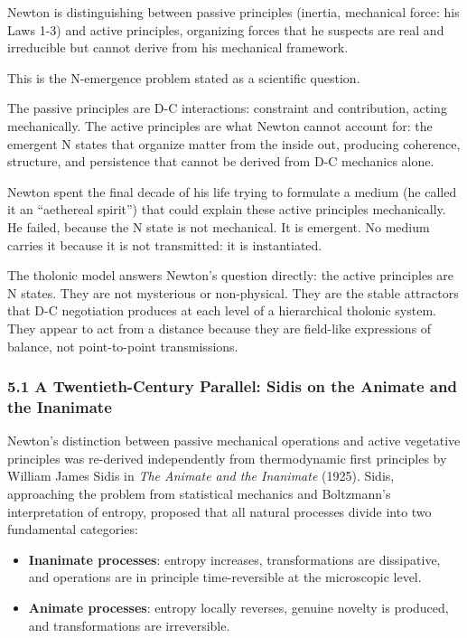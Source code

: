 \documentclass[
  11pt,
  letterpaper,
]{article}
\providecommand{\tightlist}{%
  \setlength{\itemsep}{0pt}\setlength{\parskip}{0pt}}
\begin{document}
Newton is distinguishing between passive principles (inertia, mechanical
force: his Laws 1-3) and active principles, organizing forces that he
suspects are real and irreducible but cannot derive from his mechanical
framework.

This is the N-emergence problem stated as a scientific question.

The passive principles are D-C interactions: constraint and
contribution, acting mechanically. The active principles are what Newton
cannot account for: the emergent N states that organize matter from the
inside out, producing coherence, structure, and persistence that cannot
be derived from D-C mechanics alone.

Newton spent the final decade of his life trying to formulate a medium
(he called it an ``aethereal spirit'') that could explain these active
principles mechanically. He failed, because the N state is not
mechanical. It is emergent. No medium carries it because it is not
transmitted: it is instantiated.

The tholonic model answers Newton's question directly: the active
principles are N states. They are not mysterious or non-physical. They
are the stable attractors that D-C negotiation produces at each level of
a hierarchical tholonic system. They appear to act from a distance
because they are field-like expressions of balance, not point-to-point
transmissions.

\subsubsection{5.1 A Twentieth-Century Parallel: Sidis on the Animate
and the
Inanimate}\label{a-twentieth-century-parallel-sidis-on-the-animate-and-the-inanimate}

Newton's distinction between passive mechanical operations and active
vegetative principles was re-derived independently from thermodynamic
first principles by William James Sidis in \emph{The Animate and the
Inanimate} (1925). Sidis, approaching the problem from statistical
mechanics and Boltzmann's interpretation of entropy, proposed that all
natural processes divide into two fundamental categories:

\begin{itemize}
\tightlist
\item
  \textbf{Inanimate processes}: entropy increases, transformations are
  dissipative, and operations are in principle time-reversible at the
  microscopic level.
\item
  \textbf{Animate processes}: entropy locally reverses, genuine novelty
  is produced, and transformations are irreversible.
\end{itemize}
\end{document}

